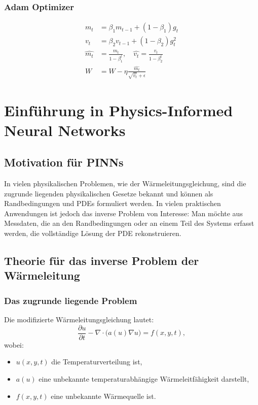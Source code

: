 \subsubsection{Adam Optimizer}
\begin{align}
	m_t &= \beta_1 m_{t-1} + (1 - \beta_1) g_t \\
	v_t &= \beta_2 v_{t-1} + (1 - \beta_2) g_t^2 \\
	\hat{m_t} &= \frac{m_t}{1 - \beta_1^t}, \quad \hat{v_t} = \frac{v_t}{1 - \beta_2^t} \\
	W &= W - \eta \frac{\hat{m_t}}{\sqrt{\hat{v_t}} + \epsilon}
\end{align}

\section{Einführung in Physics-Informed Neural Networks}

\subsection{Motivation für PINNs}
In vielen physikalischen Problemen, wie der Wärmeleitungsgleichung, sind die zugrunde liegenden physikalischen Gesetze bekannt und können als Randbedingungen und PDEs formuliert werden. In vielen praktischen Anwendungen ist jedoch das inverse Problem von Interesse: Man möchte aus Messdaten, die an den Randbedingungen oder an einem Teil des Systems erfasst werden, die vollständige Lösung der PDE rekonstruieren.


\subsection{Theorie für das inverse Problem der Wärmeleitung}

\subsubsection{Das zugrunde liegende Problem}

Die modifizierte Wärmeleitungsgleichung lautet:
\[
\frac{\partial u}{\partial t} - \nabla \cdot \big(a(u) \nabla u\big) = f(x, y, t),
\]
wobei:
\begin{itemize}
	\item \(u(x, y, t)\) die Temperaturverteilung ist,
	\item \(a(u)\) eine unbekannte temperaturabhängige Wärmeleitfähigkeit darstellt,
	\item \(f(x, y, t)\) eine unbekannte Wärmequelle ist.
\end{itemize}

